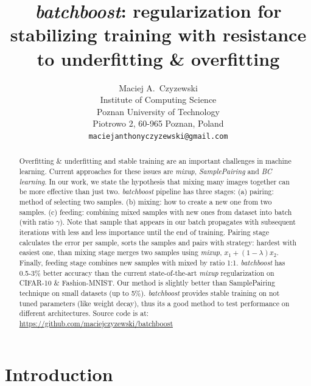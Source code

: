 \documentclass{article}
\title{\emph{batchboost}: regularization for stabilizing training with
	resistance to underfitting \& overfitting}
\author{
  Maciej A.~Czyzewski\\
  Institute of Computing Science\\
  Poznan University of Technology\\
  Piotrowo 2, 60-965 Poznan, Poland\\
  \texttt{maciejanthonyczyzewski@gmail.com} \\
}
\begin{document}
\maketitle


\begin{abstract}
	Overfitting \& underfitting and stable training are an important challenges in
	machine learning.
	Current approaches for these issues are \emph{mixup}\cite{zhang2017mixup},
	\emph{SamplePairing}\cite{inoue2018data}
	and \emph{BC learning}\cite{tokozume2018between}.
	In our work, we state the hypothesis that mixing many images together can be more
	effective than just two.
	\emph{batchboost} pipeline has three stages:
	(a) pairing: method of selecting two samples.
	(b) mixing: how to create a new one from two samples.
	(c) feeding: combining mixed samples with new ones from dataset into batch (with ratio $\gamma$).
	Note that sample that appears in our batch propagates with
	subsequent iterations with less and less importance until the end of training.
	Pairing stage calculates the error per sample, sorts the samples and pairs
	with strategy: hardest with easiest one, than mixing stage merges two samples
	using \emph{mixup}, $x_1 + (1-\lambda)x_2$. Finally, feeding stage combines
	new samples with mixed by ratio 1:1. 
	\emph{batchboost} has 0.5-3\% better accuracy than the current
	state-of-the-art \emph{mixup} regularization on
	CIFAR-10\cite{krizhevsky2009learning} \&
	Fashion-MNIST\cite{xiao2017}.
	Our method is slightly better than SamplePairing technique
	on small datasets (up to 5\%).
	\emph{batchboost} provides stable training on not tuned parameters (like weight
	decay), thus its a good method to test performance on different architectures.
	Source code is at: \url{https://github.com/maciejczyzewski/batchboost}
\end{abstract}


\section{Introduction}
\label{sec:introduction}
\end{document}
